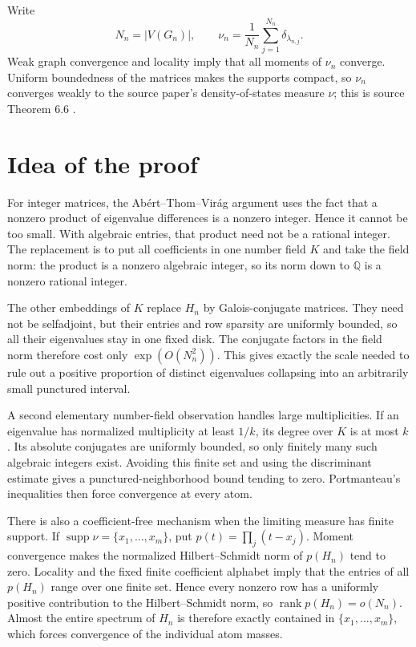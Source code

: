 \documentclass[11pt]{article}
\theoremstyle{definition}
\theoremstyle{remark}
\newcommand{\Q}{\mathbb{Q}}
\begin{document}
Write
\[
  N_n=|V(G_n)|,\qquad
  \nu_n=\frac1{N_n}\sum_{j=1}^{N_n}\delta_{\lambda_{n,j}} .
\]
Weak graph convergence and locality imply that all moments of $\nu_n$
converge.  Uniform boundedness of the matrices makes the supports compact, so
$\nu_n$ converges weakly to the source paper's density-of-states measure
$\nu$; this is source Theorem 6.6 \cite{Pogorzelski}.

\section{Idea of the proof}

For integer matrices, the Ab\'ert--Thom--Vir\'ag argument uses the fact that a
nonzero product of eigenvalue differences is a nonzero integer.  Hence it
cannot be too small.  With algebraic entries, that product need not be a
rational integer.  The replacement is to put all coefficients in one number
field $K$ and take the field norm: the product is a nonzero algebraic integer,
so its norm down to $\Q$ is a nonzero rational integer.

The other embeddings of $K$ replace $H_n$ by Galois-conjugate matrices.  They
need not be selfadjoint, but their entries and row sparsity are uniformly
bounded, so all their eigenvalues stay in one fixed disk.  The conjugate
factors in the field norm therefore cost only
$\exp(O(N_n^2))$.  This gives exactly the scale needed to rule out a positive
proportion of distinct eigenvalues collapsing into an arbitrarily small
punctured interval.

A second elementary number-field observation handles large multiplicities.
If an eigenvalue has normalized multiplicity at least $1/k$, its degree over
$K$ is at most $k$.  Its absolute conjugates are uniformly bounded, so only
finitely many such algebraic integers exist.  Avoiding this finite set and
using the discriminant estimate gives a punctured-neighborhood bound tending
to zero.  Portmanteau's inequalities then force convergence at every atom.

There is also a coefficient-free mechanism when the limiting measure has
finite support.  If $\operatorname{supp}\nu=\{x_1,\ldots,x_m\}$, put
$p(t)=\prod_j(t-x_j)$.  Moment convergence makes the normalized
Hilbert--Schmidt norm of $p(H_n)$ tend to zero.  Locality and the fixed finite
coefficient alphabet imply that the entries of all $p(H_n)$ range over one
finite set.  Hence every nonzero row has a uniformly positive contribution
to the Hilbert--Schmidt norm, so $\operatorname{rank}p(H_n)=o(N_n)$.  Almost
the entire spectrum of $H_n$ is therefore exactly contained in
$\{x_1,\ldots,x_m\}$, which forces convergence of the individual atom masses.
\end{document}
